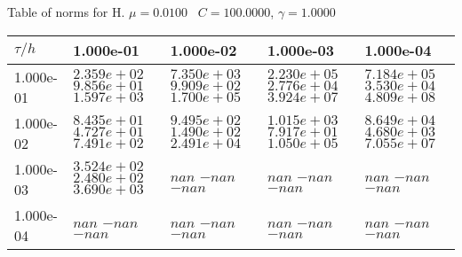 \begin{center}
Table of norms for H. $\mu = 0.0100$ \, $C = 100.0000$, $\gamma = 1.0000$
  
\begin{tabular}{|p{1in}|p{1in}|p{1in}|p{1in}|p{1in}|} \hline
$\tau / h$ &1.000e-01 &1.000e-02 &1.000e-03 &1.000e-04 \\ \hline 
1.000e-01 & $2.359e+02$  $9.856e+01$  $1.597e+03$  & $7.350e+03$  $9.909e+02$  $1.700e+05$  & $2.230e+05$  $2.776e+04$  $3.924e+07$  & $7.184e+05$  $3.530e+04$  $4.809e+08$  \\ \hline 
1.000e-02 & $8.435e+01$  $4.727e+01$  $7.491e+02$  & $9.495e+02$  $1.490e+02$  $2.491e+04$  & $1.015e+03$  $7.917e+01$  $1.050e+05$  & $8.649e+04$  $4.680e+03$  $7.055e+07$  \\ \hline 
1.000e-03 & $3.524e+02$  $2.480e+02$  $3.690e+03$  & $nan$  $-nan$  $-nan$  & $nan$  $-nan$  $-nan$  & $nan$  $-nan$  $-nan$  \\ \hline 
1.000e-04 & $nan$  $-nan$  $-nan$  & $nan$  $-nan$  $-nan$  & $nan$  $-nan$  $-nan$  & $nan$  $-nan$  $-nan$  \\ \hline 

\end{tabular}\\[20pt]
\end{center}
